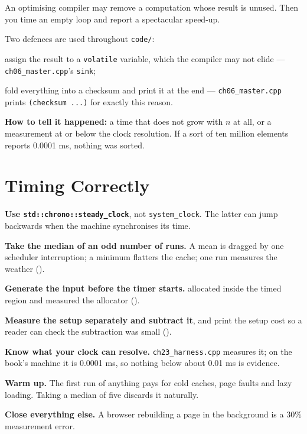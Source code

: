 \begin{conceptbox}
An optimising compiler may remove a computation whose result is unused. Then
you time an empty loop and report a spectacular speed-up.

\smallskip
Two defences are used throughout \texttt{code/}:
\begin{tight}
  \item assign the result to a \texttt{volatile} variable, which the compiler
        may not elide --- \texttt{ch06\_master.cpp}'s \texttt{sink};
  \item fold everything into a checksum and print it at the end ---
        \texttt{ch06\_master.cpp} prints \texttt{(checksum ...)} for exactly
        this reason.
\end{tight}

\smallskip
\textbf{How to tell it happened:} a time that does not grow with $n$ at all, or
a measurement at or below the clock resolution. If a sort of ten million
elements reports 0.0001 ms, nothing was sorted.
\end{conceptbox}

\section{Timing Correctly}

\begin{conceptbox}
\begin{tightnum}
  \item \textbf{Use \texttt{std::chrono::steady\_clock}}, not
        \texttt{system\_clock}. The latter can jump backwards when the machine
        synchronises its time.
  \item \textbf{Take the median of an odd number of runs.} A mean is dragged by
        one scheduler interruption; a minimum flatters the cache; one run
        measures the weather ().
  \item \textbf{Generate the input before the timer starts.} 
        allocated inside the timed region and measured the allocator
        ().
  \item \textbf{Measure the setup separately and subtract it}, and print the
        setup cost so a reader can check the subtraction was small
        ().
  \item \textbf{Know what your clock can resolve.} \texttt{ch23\_harness.cpp}
        measures it; on the book's machine it is 0.0001 ms, so nothing below
        about 0.01 ms is evidence.
  \item \textbf{Warm up.} The first run of anything pays for cold caches, page
        faults and lazy loading. Taking a median of five discards it
        naturally.
  \item \textbf{Close everything else.} A browser rebuilding a page in the
        background is a 30\% measurement error.
\end{tightnum}
\end{conceptbox}

